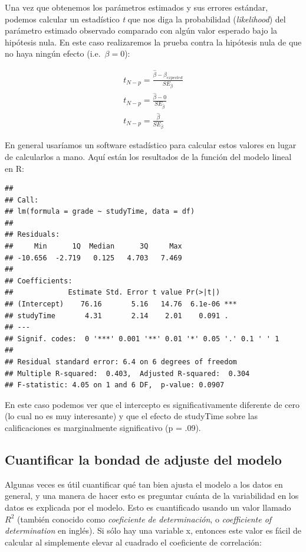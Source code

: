 \documentclass[
  12pt,
]{book}
\begin{document}
Una vez que obtenemos los parámetros estimados y sus errores estándar, podemos calcular un estadístico \emph{t} que nos diga la probabilidad (\emph{likelihood}) del parámetro estimado observado comparado con algún valor esperado bajo la hipótesis nula. En este caso realizaremos la prueba contra la hipótesis nula de que no haya ningún efecto (i.e.~\(\beta=0\)):

\[
\begin{array}{c}
t_{N - p} = \frac{\hat{\beta} - \beta_{expected}}{SE_{\hat{\beta}}}\\
t_{N - p} = \frac{\hat{\beta} - 0}{SE_{\hat{\beta}}}\\
t_{N - p} = \frac{\hat{\beta} }{SE_{\hat{\beta}}}
\end{array}
\]

En general usaríamos un software estadístico para calcular estos valores en lugar de calcularlos a mano. Aquí están los resultados de la función del modelo lineal en R:

\begin{verbatim}
## 
## Call:
## lm(formula = grade ~ studyTime, data = df)
## 
## Residuals:
##     Min      1Q  Median      3Q     Max 
## -10.656  -2.719   0.125   4.703   7.469 
## 
## Coefficients:
##             Estimate Std. Error t value Pr(>|t|)    
## (Intercept)    76.16       5.16   14.76  6.1e-06 ***
## studyTime       4.31       2.14    2.01    0.091 .  
## ---
## Signif. codes:  0 '***' 0.001 '**' 0.01 '*' 0.05 '.' 0.1 ' ' 1
## 
## Residual standard error: 6.4 on 6 degrees of freedom
## Multiple R-squared:  0.403,  Adjusted R-squared:  0.304 
## F-statistic: 4.05 on 1 and 6 DF,  p-value: 0.0907
\end{verbatim}

En este caso podemos ver que el intercepto es significativamente diferente de cero (lo cual no es muy interesante) y que el efecto de studyTime sobre las calificaciones es marginalmente significativo (p = .09).

\hypertarget{cuantificar-la-bondad-de-adjuste-del-modelo}{%
\subsection{Cuantificar la bondad de adjuste del modelo}\label{cuantificar-la-bondad-de-adjuste-del-modelo}}

Algunas veces es útil cuantificar qué tan bien ajusta el modelo a los datos en general, y una manera de hacer esto es preguntar cuánta de la variabilidad en los datos es explicada por el modelo. Esto es cuantificado usando un valor llamado \(R^2\) (también conocido como \emph{coeficiente de determinación}, o \emph{coefficiente of determination} en inglés). Si sólo hay una variable x, entonces este valor es fácil de calcular al simplemente elevar al cuadrado el coeficiente de correlación:
\end{document}
